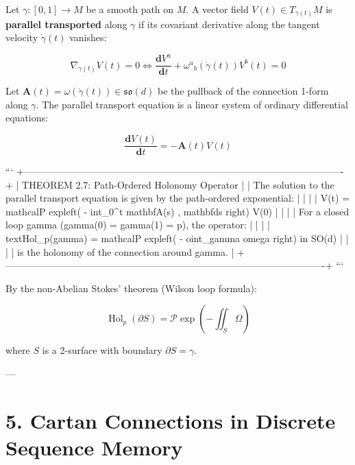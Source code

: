 \documentclass[11pt,twoside,openright]{amsbook}
\begin{document}
{{{{{{Let $\gamma : [0, 1] \to M$ be a smooth path on $M$. A vector field $V(t) \in T_{\gamma(t)}M$ is \textbf{parallel transported} along $\gamma$ if its covariant derivative along the tangent velocity $\dot{\gamma}(t)$ vanishes:

$$\nabla_{\dot{\gamma}(t)} V(t) = 0 \iff \frac{\mathbf{d}V^a}{\mathbf{d}t} + \omega^a{}_b(\dot{\gamma}(t)) V^b(t) = 0$$

Let $\mathbf{A}(t) = \omega(\dot{\gamma}(t)) \in \mathfrak{so}(d)$ be the pullback of the connection 1-form along $\gamma$. The parallel transport equation is a linear system of ordinary differential equations:

$$\frac{\mathbf{d}V(t)}{\mathbf{d}t} = -\mathbf{A}(t) V(t)$$

```
+----------------------------------------------------------------------------------------------------+
| THEOREM 2.7: Path-Ordered Holonomy Operator                                                        |
| The solution to the parallel transport equation is given by the path-ordered exponential:          |
|                                                                                                    |
|   V(t) = mathcal{P} expleft( - int_0^t mathbf{A}(s) , mathbf{d}s right) V(0)                      |
|                                                                                                    |
| For a closed loop gamma (gamma(0) = gamma(1) = p), the operator:                                   |
|                                                                                                    |
|   text{Hol}_p(gamma) = mathcal{P} expleft( - oint_gamma omega right) in SO(d)                       |
|                                                                                                    |
| is the holonomy of the connection around gamma.                                                    |
+----------------------------------------------------------------------------------------------------+
```

By the non-Abelian Stokes' theorem (Wilson loop formula):

$$\operatorname{Hol}_p(\partial S) = \mathcal{P} \exp\left( - \iint_S \Omega \right)$$

where $S$ is a 2-surface with boundary $\partial S = \gamma$.

---

\section{5. Cartan Connections in Discrete Sequence Memory}

}}}}}}
\end{document}
